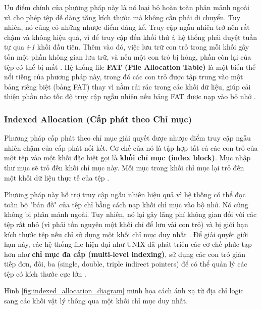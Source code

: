\documentclass[12pt]{article}
\begin{document}
Ưu điểm chính của phương pháp này là nó loại bỏ hoàn toàn phân mảnh ngoài và cho phép tệp dễ dàng tăng kích thước mà không cần phải di chuyển. Tuy nhiên, nó cũng có những nhược điểm đáng kể. Truy cập ngẫu nhiên trở nên rất chậm và không hiệu quả, vì để truy cập đến khối thứ \textit{i}, hệ thống phải duyệt tuần tự qua \textit{i-1} khối đầu tiên. Thêm vào đó, việc lưu trữ con trỏ trong mỗi khối gây tốn một phần không gian lưu trữ, và nếu một con trỏ bị hỏng, phần còn lại của tệp có thể bị mất \parencite{Tanenbaum2014}. Hệ thống file \textbf{FAT (File Allocation Table)} là một biến thể nổi tiếng của phương pháp này, trong đó các con trỏ được tập trung vào một bảng riêng biệt (bảng FAT) thay vì nằm rải rác trong các khối dữ liệu, giúp cải thiện phần nào tốc độ truy cập ngẫu nhiên nếu bảng FAT được nạp vào bộ nhớ \parencite{Fiveable2025}.

\subsubsection{Indexed Allocation (Cấp phát theo Chỉ mục)}
Phương pháp cấp phát theo chỉ mục giải quyết được nhược điểm truy cập ngẫu nhiên chậm của cấp phát nối kết. Cơ chế của nó là tập hợp tất cả các con trỏ của một tệp vào một khối đặc biệt gọi là \textbf{khối chỉ mục (index block)}. Mục nhập thư mục sẽ trỏ đến khối chỉ mục này. Mỗi mục trong khối chỉ mục lại trỏ đến một khối dữ liệu thực tế của tệp \parencite{Silberschatz2018}.

Phương pháp này hỗ trợ truy cập ngẫu nhiên hiệu quả vì hệ thống có thể đọc toàn bộ "bản đồ" của tệp chỉ bằng cách nạp khối chỉ mục vào bộ nhớ. Nó cũng không bị phân mảnh ngoài. Tuy nhiên, nó lại gây lãng phí không gian đối với các tệp rất nhỏ (vì phải tốn nguyên một khối chỉ để lưu vài con trỏ) và bị giới hạn kích thước tệp nếu chỉ sử dụng một khối chỉ mục duy nhất \parencite{IRJMETS2021}. Để giải quyết giới hạn này, các hệ thống file hiện đại như UNIX đã phát triển các cơ chế phức tạp hơn như \textbf{chỉ mục đa cấp (multi-level indexing)}, sử dụng các con trỏ gián tiếp đơn, đôi, ba (single, double, triple indirect pointers) để có thể quản lý các tệp có kích thước cực lớn \parencite{Tanenbaum2014}.

Hình \ref{fig:indexed_allocation_diagram} minh họa cách ánh xạ từ địa chỉ logic sang các khối vật lý thông qua một khối chỉ mục duy nhất.
\end{document}
